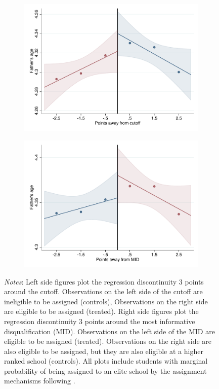 \documentclass[oneside,11pt]{article}
\begin{document}
\begin{figure}[H]
\begin{center}
    \begin{subfigure}{0.475\textwidth}
        \centering
        \includegraphics[width=\textwidth]{04_Figures/rd_plot_tau_edad_pad_UNAM3.pdf}
    \end{subfigure}
    \begin{subfigure}{0.475\textwidth}
        \centering
        \includegraphics[width=\textwidth]{04_Figures/rd_plot_mid_edad_pad_UNAM3.pdf}
    \end{subfigure}
    \end{center}
    
\footnotesize
\textit{Notes}: Left side figures plot the regression discontinuity 3 points around the cutoff. Observations on the left side of the cutoff are ineligible to be assigned (controls), Observations on the right side are eligible to be assigned (treated). Right side figures plot the regression discontinuity 3 points around the most informative disqualification (MID). Observations on the left side of the MID are eligible to be assigned (treated). Observations on the right side are also eligible to be assigned, but they are also eligible at a higher ranked school (controls). All plots include students with marginal probability of being assigned to an elite school by the assignment mechanisms following \citet{abdulkadirouglu2022breaking}. 
\end{figure}
\end{document}
